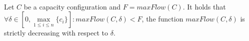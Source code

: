 \begin{lemma} \ \\
   \label{maxflowdec}
   Let $C$ be a capacity configuration and $F = maxFlow(C)$. It holds that $\forall \delta \in
   [0, \max\limits_{1 \leq i \leq n}{\{c_i\}}] : maxFlow\left(C, \delta\right) < F$, the function
   $maxFlow\left(C, \delta\right)$ is strictly decreasing with respect to $\delta$.
\end{lemma}
